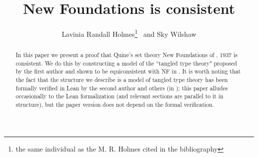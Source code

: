 \documentclass{article}
\title{New Foundations is consistent}
\author{Lavinia Randall Holmes\footnote{the same individual as the M. R. Holmes cited in the bibliography} \, and Sky Wilshaw}
\theoremstyle{definition}
\theoremstyle{remark}
\begin{document}
\maketitle

\begin{abstract}

In this paper we present a proof that Quine's set theory New Foundations of \cite{nf}, 1937 is consistent.
We do this by constructing a model of the ``tangled type theory" proposed by the first author and shown to be equiconsistent with NF in \cite{tangled}.  It is worth noting that the fact that the structure we describe is a model of tangled type theory has been formally verified in Lean by the second author and others (in \cite{wilshaw});  this paper alludes occasionally to the Lean formalization (and relevant sections are parallel to it in structure), but the paper version does not depend on the formal verification.


\end{abstract}
\end{document}
